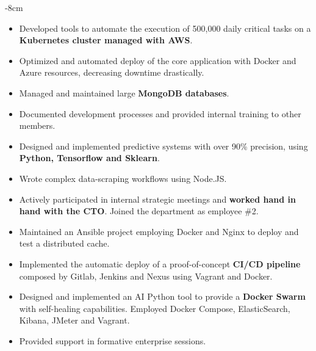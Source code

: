 \documentclass[10pt,a4paper]{altacv}
\begin{document}


\begin{adjustwidth}{}{-8cm}
\makecvheader
\end{adjustwidth}


\begin{itemize}
\item Developed tools to automate the execution of 500,000 daily critical tasks on a \textbf{Kubernetes cluster managed with AWS}.
\item Optimized and automated deploy of the core application with Docker and Azure resources, decreasing downtime drastically.
\item Managed and maintained large \textbf{MongoDB databases}.
\item Documented development processes and provided internal training to other members.
\item Designed and implemented predictive systems with over 90\% precision, using \textbf{Python, Tensorflow and Sklearn}.
\item Wrote complex data-scraping workflows using Node.JS.
\item Actively participated in internal strategic meetings and \textbf{worked hand in hand with the CTO}. Joined the department as employee \#2.
\end{itemize}

\divider

\begin{itemize}
\item Maintained an Ansible project employing Docker and Nginx to deploy and test a distributed cache.
\item Implemented the automatic deploy of a proof-of-concept \textbf{CI/CD pipeline} composed by Gitlab, Jenkins and Nexus using Vagrant and Docker.
\item Designed and implemented an AI Python tool to provide a \textbf{Docker Swarm} with self-healing capabilities. Employed Docker Compose, ElasticSearch, Kibana, JMeter and Vagrant.
\item Provided support in formative enterprise sessions.
\end{itemize}
\end{document}
